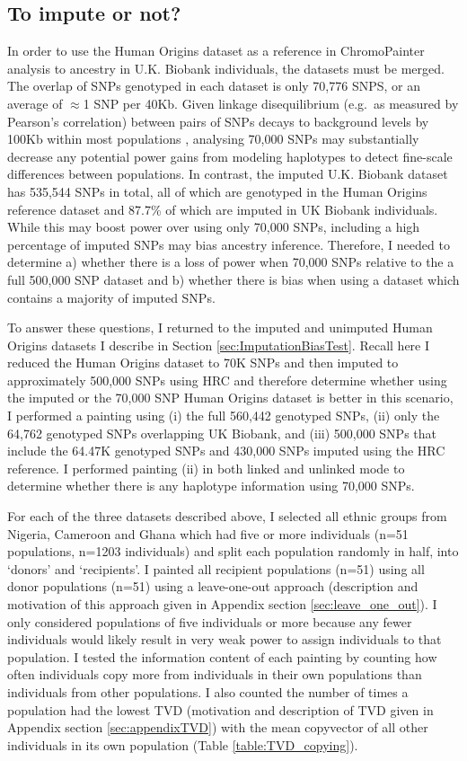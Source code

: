 \subsection{To impute or not?}

In order to use the Human Origins dataset as a reference in ChromoPainter analysis to ancestry in U.K. Biobank individuals, the datasets must be merged. The overlap of SNPs genotyped in each dataset is only 70,776 SNPS, or an average of $\approx$1 SNP per 40Kb. Given linkage disequilibrium (e.g.\ as measured by Pearson's correlation) between pairs of SNPs decays to background levels by 100Kb within most populations \cite{bosch2009decay}, analysing 70,000 SNPs may substantially decrease any potential power gains from modeling haplotypes to detect fine-scale differences between populations. In contrast, the imputed U.K. Biobank dataset has 535,544 SNPs in total, all of which are genotyped in the Human Origins reference dataset and 87.7\% of which are imputed in UK Biobank individuals. While this may boost power over using only 70,000 SNPs, including a high percentage of imputed SNPs may bias ancestry inference. Therefore, I needed to determine a) whether there is a loss of power when 70,000 SNPs relative to the a full 500,000 SNP dataset and b) whether there is bias when using a dataset which contains a majority of imputed SNPs.  

To answer these questions, I returned to the imputed and unimputed Human Origins datasets I describe in Section \ref{sec:ImputationBiasTest}. Recall here I reduced the Human Origins dataset to 70K SNPs and then imputed to approximately 500,000 SNPs using HRC and therefore determine whether using the imputed or the 70,000 SNP Human Origins dataset is better in this scenario, I performed a painting using (i) the full 560,442 genotyped SNPs, (ii) only the 64,762 genotyped SNPs overlapping UK Biobank, and (iii) 500,000 SNPs that include the 64.47K genotyped SNPs and 430,000 SNPs imputed using the HRC reference. I performed painting (ii) in both linked and unlinked mode to determine whether there is any haplotype information using 70,000 SNPs.

For each of the three datasets described above, I selected all ethnic groups from Nigeria, Cameroon and Ghana which had five or more individuals (n=51 populations, n=1203 individuals) and split each population randomly in half, into `donors' and `recipients'. I painted all recipient populations (n=51) using all donor populations (n=51) using a leave-one-out approach (description and motivation of this approach given in Appendix section \ref{sec:leave_one_out}). I only considered populations of five individuals or more because any fewer individuals would likely result in very weak power to assign individuals to that population. I tested the information content of each painting by counting how often individuals copy more from individuals in their own populations than individuals from other populations. I also counted the number of times a population had the lowest TVD (motivation and description of TVD given in Appendix section \ref{sec:appendixTVD}) with the mean copyvector of all other individuals in its own population (Table \ref{table:TVD_copying}).


